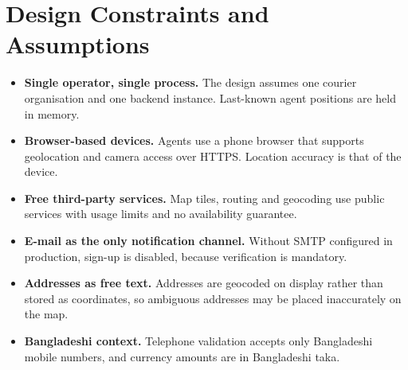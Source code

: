 \section{Design Constraints and Assumptions}
\label{sec:constraints}

\begin{itemize}
  \item \textbf{Single operator, single process.} The design assumes one courier organisation and one backend instance. Last-known agent positions are held in memory.
  \item \textbf{Browser-based devices.} Agents use a phone browser that supports geolocation and camera access over HTTPS. Location accuracy is that of the device.
  \item \textbf{Free third-party services.} Map tiles, routing and geocoding use public services with usage limits and no availability guarantee.
  \item \textbf{E-mail as the only notification channel.} Without SMTP configured in production, sign-up is disabled, because verification is mandatory.
  \item \textbf{Addresses as free text.} Addresses are geocoded on display rather than stored as coordinates, so ambiguous addresses may be placed inaccurately on the map.
  \item \textbf{Bangladeshi context.} Telephone validation accepts only Bangladeshi mobile numbers, and currency amounts are in Bangladeshi taka.
\end{itemize}
